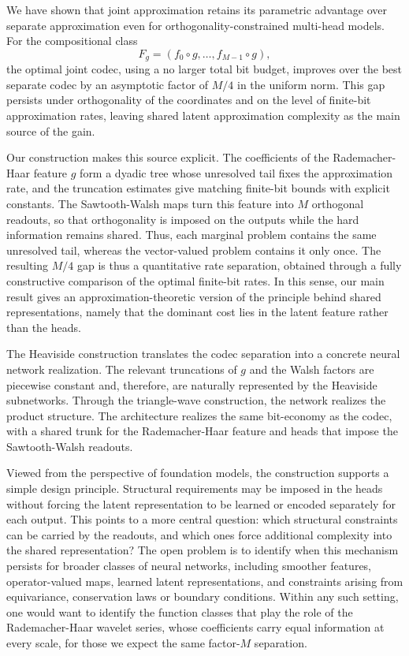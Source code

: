\documentclass[twoside,11pt]{article}
\begin{document}
We have shown that joint approximation retains its parametric advantage over separate approximation even for orthogonality-constrained multi-head models. For the compositional class
\[
F_g=(f_0\circ g,\ldots,f_{M-1}\circ g),
\]
the optimal joint codec, using a no larger total bit budget, improves over the best separate codec by an asymptotic factor of $M/4$ in the uniform norm. This gap persists under orthogonality of the coordinates and on the level of finite-bit approximation rates, leaving shared latent approximation complexity as the main source of the gain.

Our construction makes this source explicit. The coefficients of the Rademacher-Haar feature $g$ form a dyadic tree whose unresolved tail fixes the approximation rate, and the truncation estimates give matching finite-bit bounds with explicit constants. The Sawtooth-Walsh maps turn this feature into $M$ orthogonal readouts, so that orthogonality is imposed on the outputs while the hard information remains shared. Thus, each marginal problem contains the same unresolved tail, whereas the vector-valued problem contains it only once. The resulting $M/4$ gap is thus a quantitative rate separation, obtained through a fully constructive comparison of the optimal finite-bit rates. In this sense, our main result gives an approximation-theoretic version of the principle behind shared representations, namely that the dominant cost lies in the latent feature rather than the heads.

The Heaviside construction translates the codec separation into a concrete neural network realization. The relevant truncations of $g$ and the Walsh factors are piecewise constant and, therefore, are naturally represented by the Heaviside subnetworks. Through the triangle-wave construction, the network realizes the product structure. The architecture realizes the same bit-economy as the codec, with a shared trunk for the Rademacher-Haar feature and heads that impose the Sawtooth-Walsh readouts.

Viewed from the perspective of foundation models, the construction supports a simple design principle. Structural requirements may be imposed in the heads without forcing the latent representation to be learned or encoded separately for each output. This points to a more central question: which structural constraints can be carried by the readouts, and which ones force additional complexity into the shared representation? The open problem is to identify when this mechanism persists for broader classes of neural networks, including smoother features, operator-valued maps, learned latent representations, and constraints arising from equivariance, conservation laws or boundary conditions. Within any such setting, one would want to identify the function classes that play the role of the Rademacher-Haar wavelet series, whose coefficients carry equal information at every scale, for those we expect the same factor-$M$ separation.  



\end{document}
